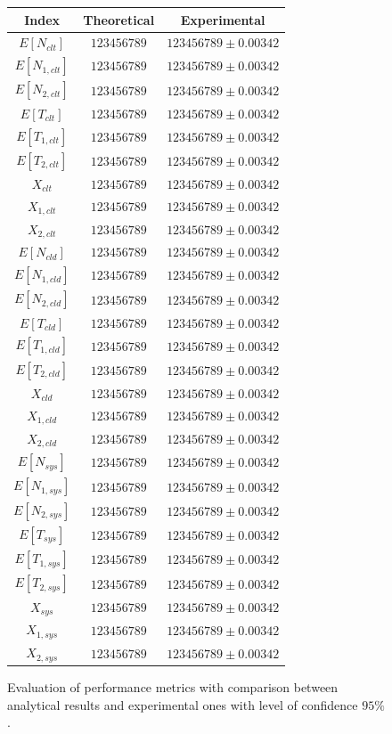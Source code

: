 \begin{figure}
	\begin{center}
		\begin{tabular}{|c||c|c|}
			\hline
			Index & Theoretical & Experimental\\
			\hline
			$E[N_{clt}]$  & $123456789$ & $123456789\pm 0.00342$ \\
			$E[N_{1,clt}]$  & $123456789$ & $123456789\pm 0.00342$ \\
			$E[N_{2,clt}]$  & $123456789$ & $123456789\pm 0.00342$ \\
			$E[T_{clt}]$  & $123456789$ & $123456789\pm 0.00342$ \\
			$E[T_{1,clt}]$  & $123456789$ & $123456789\pm 0.00342$ \\
			$E[T_{2,clt}]$  & $123456789$ & $123456789\pm 0.00342$ \\
			$X_{clt}$  & $123456789$ & $123456789\pm 0.00342$ \\
			$X_{1,clt}$  & $123456789$ & $123456789\pm 0.00342$ \\
			$X_{2,clt}$  & $123456789$ & $123456789\pm 0.00342$ \\
			\hline
			$E[N_{cld}]$  & $123456789$ & $123456789\pm 0.00342$ \\
			$E[N_{1,cld}]$  & $123456789$ & $123456789\pm 0.00342$ \\
			$E[N_{2,cld}]$  & $123456789$ & $123456789\pm 0.00342$ \\
			$E[T_{cld}]$  & $123456789$ & $123456789\pm 0.00342$ \\
			$E[T_{1,cld}]$  & $123456789$ & $123456789\pm 0.00342$ \\
			$E[T_{2,cld}]$  & $123456789$ & $123456789\pm 0.00342$ \\
			$X_{cld}$  & $123456789$ & $123456789\pm 0.00342$ \\
			$X_{1,cld}$  & $123456789$ & $123456789\pm 0.00342$ \\
			$X_{2,cld}$  & $123456789$ & $123456789\pm 0.00342$ \\
			\hline
			$E[N_{sys}]$  & $123456789$ & $123456789\pm 0.00342$ \\
			$E[N_{1,sys}]$  & $123456789$ & $123456789\pm 0.00342$ \\
			$E[N_{2,sys}]$  & $123456789$ & $123456789\pm 0.00342$ \\
			$E[T_{sys}]$  & $123456789$ & $123456789\pm 0.00342$ \\
			$E[T_{1,sys}]$  & $123456789$ & $123456789\pm 0.00342$ \\
			$E[T_{2,sys}]$  & $123456789$ & $123456789\pm 0.00342$ \\
			$X_{sys}$  & $123456789$ & $123456789\pm 0.00342$ \\
			$X_{1,sys}$  & $123456789$ & $123456789\pm 0.00342$ \\
			$X_{2,sys}$  & $123456789$ & $123456789\pm 0.00342$ \\
			\hline
		\end{tabular}
	\end{center}
	\caption{Evaluation of performance metrics with comparison between analytical results and experimental ones with level of confidence $95\%$.}
	\label{tbl:evaluation}
\end{figure}

